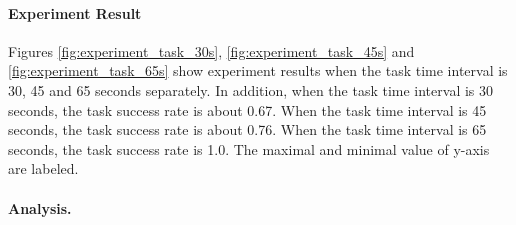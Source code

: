 \paragraph{Experiment Result} 
Figures \ref{fig:experiment_task_30s}, \ref{fig:experiment_task_45s} and \ref{fig:experiment_task_65s} show experiment results when the task time interval is 30, 45 and 65 seconds separately. 
In addition, when the task time interval is 30 seconds, the task success rate is about 0.67. When the task time interval is 45 seconds, the task success rate is about 0.76. 
When the task time interval is 65 seconds, the task success rate is 1.0. The maximal and minimal value of y-axis are labeled.
\paragraph{Analysis.} 
